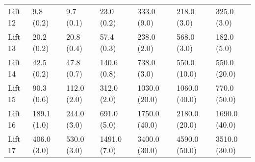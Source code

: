 \begin{tabular}{lllllll}
Lift 12 &         9.8 (0.2) &          9.7 (0.1) &            23.0 (0.2) &             333.0 (9.0) &              218.0 (3.0) &                 325.0 (3.0) \\
Lift 13 &        20.2 (0.2) &         20.8 (0.4) &            57.4 (0.3) &             238.0 (2.0) &              568.0 (3.0) &                 182.0 (5.0) \\
Lift 14 &        42.5 (0.2) &         47.8 (0.7) &           140.6 (0.8) &             738.0 (3.0) &             550.0 (10.0) &                550.0 (20.0) \\
Lift 15 &        90.3 (0.6) &        112.0 (2.0) &           312.0 (2.0) &           1030.0 (20.0) &            1060.0 (40.0) &                770.0 (50.0) \\
Lift 16 &       189.1 (1.0) &        244.0 (3.0) &           691.0 (5.0) &           1750.0 (40.0) &            2180.0 (20.0) &               1690.0 (40.0) \\
Lift 17 &       406.0 (3.0) &        530.0 (3.0) &          1491.0 (7.0) &           3400.0 (30.0) &            4590.0 (50.0) &               3510.0 (30.0) \\
\bottomrule
\end{tabular}
